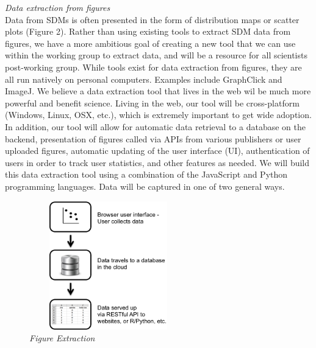 \documentclass[pdftex,11pt,a4paper]{article}\usepackage{graphicx, color}
\begin{document}
\textit{Data extraction from figures} \\
Data from SDMs is often presented in the form of distribution maps or scatter plots (Figure 2).  Rather than using existing tools to extract SDM data from figures, we have a more ambitious goal of creating a new tool that we can use within the working group to extract data, and will be a resource for all scientists post-working group.  While tools exist for data extraction from figures, they are all run natively on personal computers. Examples include GraphClick and ImageJ.  We believe a data extraction tool that lives in the web wil be much more powerful and benefit science.  Living in the web, our tool will be cross-platform (Windows, Linux, OSX, etc.), which is extremely important to get wide adoption. In addition, our tool will allow for automatic data retrieval to a database on the backend, presentation of figures called via APIs from various publishers or user uploaded figures, automatic updating of the user interface (UI), authentication of users in order to track user statistics, and other features as needed.  We will build this data extraction tool using a combination of the JavaScript and Python programming languages.  Data will be captured in one of two general ways.
\begin{figure}
\includegraphics[height=2.2in,width=2.7in]{figextract.png}
\caption{ \footnotesize{ \textit{Figure Extraction  }}\label{fig:figextract}}
\end{figure}
\end{document}
